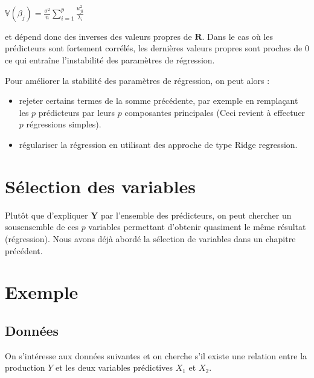 \documentclass[letterpaper,10pt,french]{sphinxmanual}
\begin{document}
\sphinxAtStartPar
\(\mathbb{V}(\beta_j) = \frac{\sigma^2}{n}\displaystyle\sum_{i=1}^p \frac{u_{ji}^2}{\lambda_i}\)

\sphinxAtStartPar
et dépend donc des inverses des valeurs propres de \(\mathbf R\). Dans le cas où les prédicteurs sont fortement corrélés, les dernières valeurs propres sont proches de 0 ce qui entraîne l’instabilité des paramètres de régression.

\sphinxAtStartPar
Pour améliorer la stabilité des paramètres de régression, on peut alors :
\begin{itemize}
\item {} 
\sphinxAtStartPar
rejeter certains termes de la somme précédente, par exemple en remplaçant les \(p\) prédicteurs par leurs \(p\) composantes principales (Ceci revient à effectuer \(p\) régressions simples).

\item {} 
\sphinxAtStartPar
régulariser la régression en utilisant des approche de type Ridge regression.

\end{itemize}


\section{Sélection des variables}
\label{\detokenize{regression:selection-des-variables}}
\sphinxAtStartPar
Plutôt que d’expliquer \(\mathbf Y\) par l’ensemble des prédicteurs, on peut chercher un sous\sphinxhyphen{}ensemble de ces \(p\) variables permettant d’obtenir quasiment le même résultat (régression). Nous avons déjà abordé la sélection de variables dans un chapitre précédent.


\section{Exemple}
\label{\detokenize{regression:exemple}}

\subsection{Données}
\label{\detokenize{regression:donnees}}
\sphinxAtStartPar
On s’intéresse aux données suivantes et on cherche s’il existe une relation entre la production \(Y\) et les deux variables prédictives \(X_1\) et \(X_2\).
\end{document}
